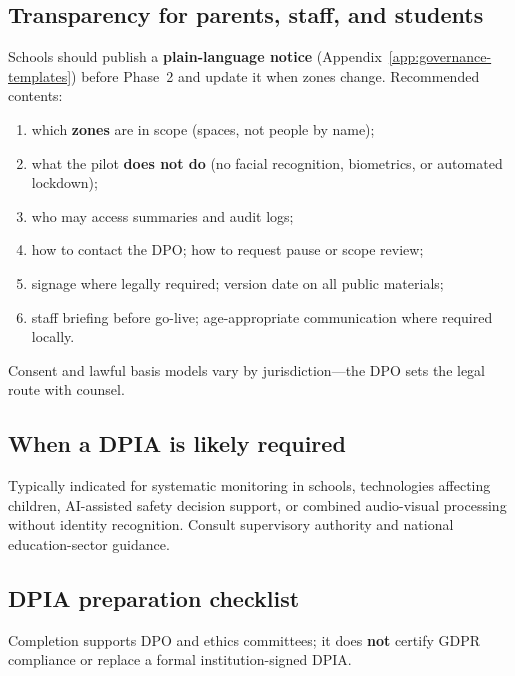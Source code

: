 \subsection{Transparency for parents, staff, and students}

Schools should publish a \textbf{plain-language notice} (Appendix~\ref{app:governance-templates})
before Phase~2 and update it when zones change.
Recommended contents:

\begin{enumerate}[noitemsep]
  \item which \textbf{zones} are in scope (spaces, not people by name);
  \item what the pilot \textbf{does not do} (no facial recognition, biometrics, or automated lockdown);
  \item who may access summaries and audit logs;
  \item how to contact the DPO; how to request pause or scope review;
  \item signage where legally required; version date on all public materials;
  \item staff briefing before go-live; age-appropriate communication where required locally.
\end{enumerate}

Consent and lawful basis models vary by jurisdiction---the DPO sets the legal route with counsel.

\subsection{When a DPIA is likely required}

Typically indicated for systematic monitoring in schools, technologies affecting children,
AI-assisted safety decision support, or combined audio-visual processing without identity recognition.
Consult supervisory authority and national education-sector guidance.

\subsection{DPIA preparation checklist}

Completion supports DPO and ethics committees; it does \textbf{not} certify GDPR compliance or
replace a formal institution-signed DPIA.

